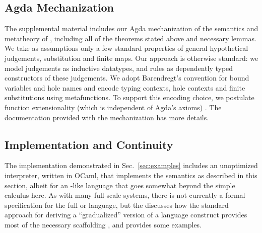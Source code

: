 
\vspace{-3px}
\subsection{Agda Mechanization}
\label{sec:agda-mechanization}
\vspace{-2px}

The supplemental material includes our Agda
mechanization  \cite{norell2009dependently,norell:thesis,Aydemir:2005fk}
of the semantics and metatheory of \HazelnutLive,
including all of the theorems stated above and necessary lemmas.
We take as assumptions only a few standard properties of general hypothetical judgements, substitution and finite maps.
%
%
%
%
%
Our approach is otherwise standard: we model judgements as
inductive datatypes, and rules as dependently typed constructors of these judgements.
%
We adopt Barendregt's convention for bound variables \cite{urban,barendregt84:_lambda_calculus} and hole names and encode typing
contexts, hole contexts and finite substitutions using metafunctions.
To support this encoding choice, we postulate function extensionality (which is independent of Agda's axioms) \cite{awodey2012inductive}.
The documentation provided with the mechanization has more details.

\vspace{-3px}
\subsection{Implementation and Continuity}\label{sec:implementation}
\vspace{-2px}

The \Hazel implementation demonstrated in Sec.~\ref{sec:examples}
includes an unoptimized interpreter, written in OCaml, that implements the semantics as described
in this section, albeit for an \Elm-like language that goes somewhat beyond the simple
calculus here. As with many full-scale systems, there is not currently a formal
specification for the full \Elm{} or \Hazel language, but the \appendixName
discusses how the standard approach for deriving a ``gradualized'' version of a
language construct provides most of the necessary scaffolding \cite{DBLP:conf/popl/CiminiS16}, and provides some examples.

